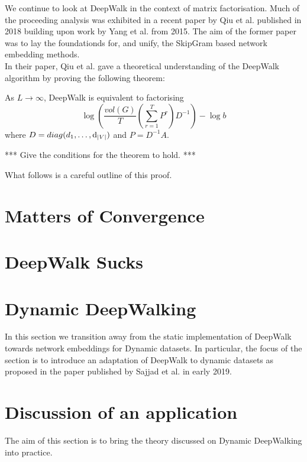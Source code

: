 \documentclass[a4paper]{article}
\begin{document}
We continue to look at DeepWalk in the context of matrix factorisation. Much of the proceeding analysis was exhibited in a recent paper by Qiu et
al.\cite{qiu2018} published in 2018 building upon work by Yang et al.\cite{yang2015}
from 2015. The aim of the former paper was to lay the foundationds for, and
unify, the SkipGram based network embedding methods.\\

In their paper, Qiu et al. gave a theoretical understanding of the DeepWalk
algorithm by proving the following theorem:

\begin{theorem}
  As $L \to \infty$, DeepWalk is equivalent to factorising
  \[\log{\left(\frac{vol(G)}{T}\left( \sum_{r = 1}^T P^r  \right) D^{-1}
    \right)} - \log{b}\]
  where $D = diag(d_1, \dots, \mathrm{d}_{|V|})$ and $P = D^{-1}A$.
\end{theorem}

*** Give the conditions for the theorem to hold. ***

What follows is a careful outline of this proof.

\section{Matters of Convergence}
\section{DeepWalk Sucks}
\section{Dynamic DeepWalking}
In this section we transition away from the static implementation of DeepWalk
towards network embeddings for Dynamic datasets. In particular, the focus of the
section is to introduce an adaptation of DeepWalk to dynamic datasets as
proposed in the paper published by Sajjad et al.\cite{sajjad2019} in early 2019.


\section{Discussion of an application}

The aim of this section is to bring the theory discussed on Dynamic DeepWalking
into practice.






\printindex
\end{document}
